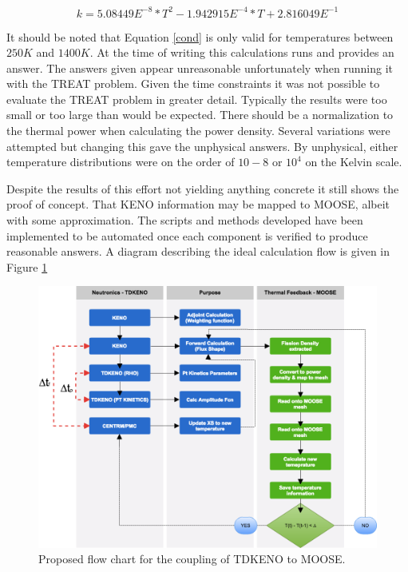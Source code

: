 \documentclass[11pt]{article}
\begin{document}
\begin{equation}
    k = 5.08449E^{-8} * T^2 - 1.942915E^{-4} * T + 2.816049E^{-1}
    \label{cond}
\end{equation}

It should be noted that Equation \ref{cond} is only valid for temperatures between $250K$ and $1400K$.
At the time of writing this calculations runs and provides an answer.  The answers given appear unreasonable unfortunately when running it with the TREAT problem.  Given the time constraints it was not possible to evaluate the TREAT problem in greater detail.  Typically the results were too small or too large than would be expected.  There should be a normalization to the thermal power when calculating the power density.  Several variations were attempted but changing this gave the unphysical answers.  By unphysical, either temperature distributions were on the order of $10-8$ or $10^4$ on the Kelvin scale. 

Despite the results of this effort not yielding anything concrete it still shows the proof of concept.  That KENO information may be mapped to MOOSE, albeit with some approximation.  The scripts and methods developed have been implemented to be automated once each component is verified to produce reasonable answers.  A diagram describing the ideal calculation flow is given in Figure \ref{fig:flow}

\begin{figure}[h]
    \centering
    \includegraphics[width=18cm]{figures/flowcharttdk.png}
    \caption{Proposed flow chart for the coupling of TDKENO to MOOSE.}
    \label{fig:flow}
\end{figure}
\end{document}
